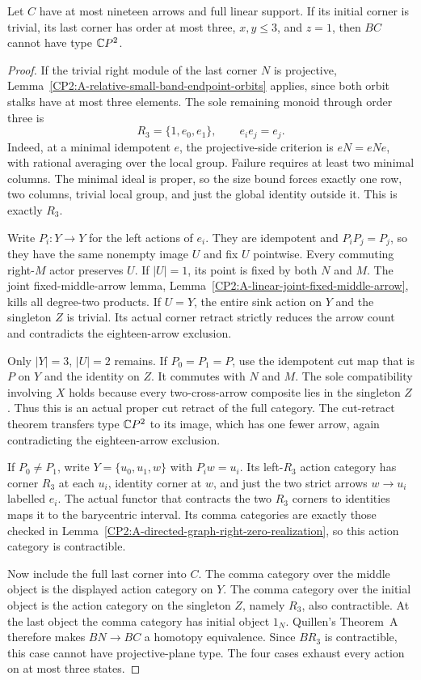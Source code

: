 \begin{lemma}
\label{CP2:A-linear19-three-sink-ternary-stalk}
Let $C$ have at most nineteen arrows and full linear support.
If its initial corner is trivial, its last corner has order
at most three, $x,y\le3$, and $z=1$, then $BC$ cannot have
type $\mathbb{C}P^2$.
\end{lemma}
\begin{proof}
If the trivial right module of the last corner $N$ is
projective, Lemma~\ref{CP2:A-relative-small-band-endpoint-orbits}
applies, since both orbit stalks have at most three elements.
The sole remaining monoid through order three is
\[
 R_3=\{1,e_0,e_1\},\qquad e_i e_j=e_j.
\]
Indeed, at a minimal idempotent $e$, the projective-side
criterion is $eN=eNe$, with rational averaging over the local
group. Failure requires at least two minimal columns. The
minimal ideal is proper, so the size bound forces exactly one
row, two columns, trivial local group, and just the global
identity outside it. This is exactly $R_3$.

Write $P_i:Y\to Y$ for the left actions of $e_i$. They are
idempotent and $P_iP_j=P_j$, so they have the same nonempty
image $U$ and fix $U$ pointwise. Every commuting right-$M$
actor preserves $U$. If $|U|=1$, its point is fixed by both
$N$ and $M$. The joint fixed-middle-arrow lemma,
Lemma~\ref{CP2:A-linear-joint-fixed-middle-arrow}, kills all
degree-two products. If $U=Y$, the entire sink action on $Y$
and the singleton $Z$ is trivial. Its actual corner retract
strictly reduces the arrow count and contradicts the
eighteen-arrow exclusion.

Only $|Y|=3$, $|U|=2$ remains. If $P_0=P_1=P$, use the
idempotent cut map that is $P$ on $Y$ and the identity on $Z$.
It commutes with $N$ and $M$. The sole compatibility involving
$X$ holds because every two-cross-arrow composite lies in
the singleton $Z$. Thus this is an actual proper cut retract
of the full category. The cut-retract theorem transfers
type $\mathbb{C}P^2$ to its image, which has one fewer arrow, again
contradicting the eighteen-arrow exclusion.

If $P_0\ne P_1$, write $Y=\{u_0,u_1,w\}$ with
$P_iw=u_i$. Its left-$R_3$ action category has corner $R_3$
at each $u_i$, identity corner at $w$, and just the two strict
arrows $w\to u_i$ labelled $e_i$. The actual functor that
contracts the two $R_3$ corners to identities maps it to the
barycentric interval. Its comma categories are exactly those
checked in Lemma~\ref{CP2:A-directed-graph-right-zero-realization},
so this action category is contractible.

Now include the full last corner into $C$. The comma category
over the middle object is the displayed action category on
$Y$. The comma category over the initial object is the
action category on the singleton $Z$, namely $R_3$, also
contractible. At the last object the comma category has
initial object $1_N$. Quillen's Theorem~A therefore makes
$BN\to BC$ a homotopy equivalence. Since $BR_3$ is
contractible, this case cannot have projective-plane type.
The four cases exhaust every action on at most three states.
\end{proof}

